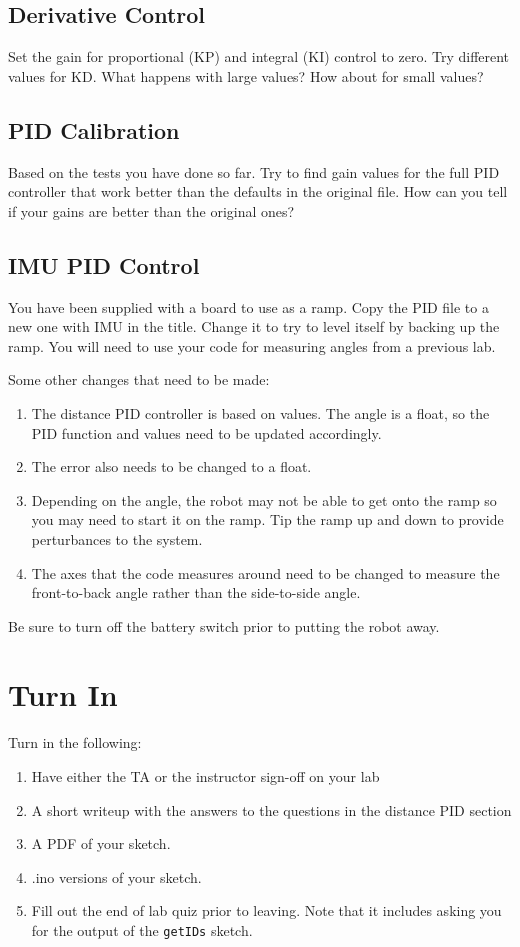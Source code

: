 \subsection{Derivative Control}
Set the gain for proportional (KP) and integral (KI) control to zero.
Try different values for KD. What happens with large values? How about 
for small values?

\subsection{PID Calibration}
Based on the tests you have done so far. Try to find gain values for the 
full PID controller that work better than the defaults in the original file.
How can you tell if your gains are better than the original ones?

\subsection{IMU PID Control}
You have been supplied with a board to use as a ramp. Copy the PID file to 
a new one with IMU in the title. Change it to try to level itself by 
backing up the ramp. You will need to use your code for measuring angles 
from a previous lab.

Some other changes that need to be made:
\begin{enumerate}
    \item The distance PID controller is based on \lstinline@int@ values.
            The angle is a float, so the PID function and values need to be 
            updated accordingly.
    \item The error also needs to be changed to a float.
    \item Depending on the angle, the robot may not be able to get onto the
            ramp so you may need to start it on the ramp. Tip the ramp up
            and down to provide perturbances to the system.
    \item The axes that the code measures around need to be changed to 
            measure the front-to-back angle rather than the side-to-side 
            angle.
\end{enumerate}

Be sure to turn off the battery switch prior to putting the robot away.

\section{Turn In}
Turn in the following:
\begin{enumerate}
    \item Have either the TA or the instructor sign-off on your lab
    \item A short writeup with the answers to the questions in the distance PID section
    \item A PDF of your sketch.
    \item .ino versions of your sketch.
    \item Fill out the end of lab quiz prior to leaving. Note that it includes asking you 
            for the output of the \lstinline$getIDs$ sketch. 
\end{enumerate}

